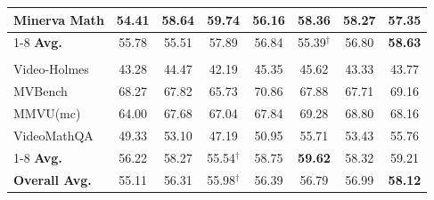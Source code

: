 \begin{table}[t]
\begin{tabular}{l cccc c c c}
\quad Minerva Math      & 54.41  & 58.64  & 59.74  & 56.16  & 58.36  & 58.27  & 57.35 \\
\cmidrule(lr){1-8}
\rowcolor{blue!5} \quad \textbf{Avg.} & 55.78  & 55.51  & 57.89  & 56.84  & 55.39$^\dagger$  & 56.80  & \textbf{58.63} \\
\midrule
\rowcolor{gray!10} \multicolumn{8}{l}{\textit{Video Reasoning}} \\
\quad Video-Holmes       & 43.28  & 44.47  & 42.19  & 45.35  & 45.62  & 43.33  & 43.77 \\
\quad MVBench           & 68.27  & 67.82  & 65.73  & 70.86  & 67.88  & 67.71  & 69.16 \\
\quad MMVU(mc)          & 64.00  & 67.68  & 67.04  & 67.84  & 69.28  & 68.80  & 68.16 \\
\quad VideoMathQA       & 49.33  & 53.10  & 47.19  & 50.95  & 55.71  & 53.43  & 55.76 \\
\cmidrule(lr){1-8}
\rowcolor{blue!5} \quad \textbf{Avg.} & 56.22  & 58.27  & 55.54$^\dagger$  & 58.75  & \textbf{59.62}  & 58.32  & 59.21 \\
\midrule
\rowcolor{blue!5} \textbf{Overall Avg.} & 55.11  & 56.31  & 55.98$^\dagger$  & 56.39  & 56.79  & 56.99  & \textbf{58.12} \\
\bottomrule
\end{tabular}
\end{table}